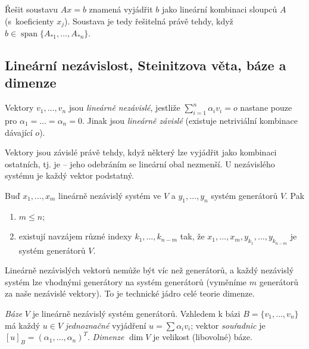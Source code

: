 \documentclass[11pt,a4paper]{article}
\newcommand{\spn}{\operatorname{span}}
\begin{document}
\begin{intuice}
Řešit soustavu $Ax=b$ znamená vyjádřit $b$ jako lineární kombinaci sloupců $A$ (s~koeficienty $x_j$). Soustava je tedy řešitelná právě tehdy, když $b\in\spn\{A_{*1},\dots,A_{*n}\}$.
\end{intuice}

\subsection{Lineární nezávislost, Steinitzova věta, báze a dimenze}

\begin{definice}
Vektory $v_1,\dots,v_n$ jsou \emph{lineárně nezávislé}, jestliže $\sum_{i=1}^n\alpha_iv_i=o$ nastane pouze pro $\alpha_1=\dots=\alpha_n=0$. Jinak jsou \emph{lineárně závislé} (existuje netriviální kombinace dávající $o$).
\end{definice}

\begin{intuice}
Vektory jsou závislé právě tehdy, když některý lze vyjádřit jako kombinaci ostatních, tj. je  -- jeho odebráním se lineární obal nezmenší. U nezávislého systému je každý vektor podstatný.
\end{intuice}

\begin{veta}
Buď $x_1,\dots,x_m$ lineárně nezávislý systém ve $V$ a $y_1,\dots,y_n$ systém generátorů $V$. Pak
\begin{enumerate}[label=(\arabic*)]
  \item $m\le n$;
  \item existují navzájem různé indexy $k_1,\dots,k_{n-m}$ tak, že $x_1,\dots,x_m,y_{k_1},\dots,y_{k_{n-m}}$ je systém generátorů $V$.
\end{enumerate}
\end{veta}

\begin{intuice}
Lineárně nezávislých vektorů nemůže být víc než generátorů, a každý nezávislý systém lze  vhodnými generátory na systém generátorů (vyměníme $m$ generátorů za naše nezávislé vektory). To je technické jádro celé teorie dimenze.
\end{intuice}

\begin{definice}
\emph{Báze} $V$ je lineárně nezávislý systém generátorů. Vzhledem k bázi $B=\{v_1,\dots,v_n\}$ má každý $u\in V$ \emph{jednoznačné} vyjádření $u=\sum\alpha_iv_i$; vektor \emph{souřadnic} je $[u]_B=(\alpha_1,\dots,\alpha_n)^T$. \emph{Dimenze} $\dim V$ je velikost (libovolné) báze.
\end{definice}
\end{document}

